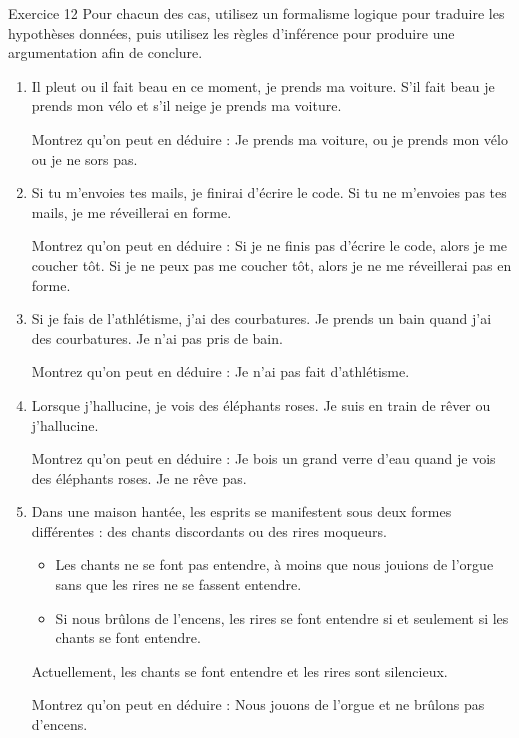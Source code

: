 \documentclass[a4paper,11pt]{article}
\begin{document}
\begin{exercisebox}{Exercice 12}
Pour chacun des cas, utilisez un formalisme logique pour traduire les hypothèses données, puis utilisez les règles d'inférence pour produire une argumentation afin de conclure.

\begin{enumerate}
    \item Il pleut ou il fait beau en ce moment, je prends ma voiture. S'il fait beau je prends mon vélo et s'il neige je prends ma voiture.
    
    Montrez qu'on peut en déduire : Je prends ma voiture, ou je prends mon vélo ou je ne sors pas.
    
    \item Si tu m'envoies tes mails, je finirai d'écrire le code. Si tu ne m'envoies pas tes mails, je me réveillerai en forme.
    
    Montrez qu'on peut en déduire : Si je ne finis pas d'écrire le code, alors je me coucher tôt. Si je ne peux pas me coucher tôt, alors je ne me réveillerai pas en forme.
    
    \item Si je fais de l'athlétisme, j'ai des courbatures. Je prends un bain quand j'ai des courbatures. Je n'ai pas pris de bain.
    
    Montrez qu'on peut en déduire : Je n'ai pas fait d'athlétisme.
    
    \item Lorsque j'hallucine, je vois des éléphants roses. Je suis en train de rêver ou j'hallucine.
    
    Montrez qu'on peut en déduire : Je bois un grand verre d'eau quand je vois des éléphants roses. Je ne rêve pas.
    
    \item Dans une maison hantée, les esprits se manifestent sous deux formes différentes : des chants discordants ou des rires moqueurs.
    \begin{itemize}
        \item Les chants ne se font pas entendre, à moins que nous jouions de l'orgue sans que les rires ne se fassent entendre.
        \item Si nous brûlons de l'encens, les rires se font entendre si et seulement si les chants se font entendre.
    \end{itemize}
    Actuellement, les chants se font entendre et les rires sont silencieux.
    
    Montrez qu'on peut en déduire : Nous jouons de l'orgue et ne brûlons pas d'encens.
\end{enumerate}
\end{exercisebox}
\end{document}
